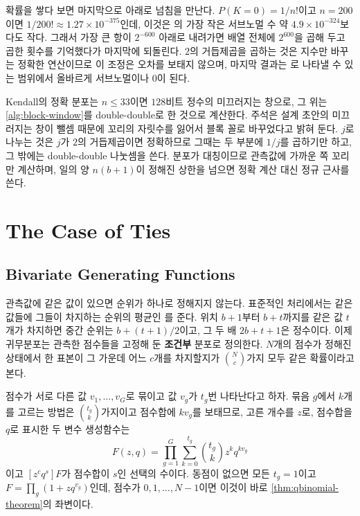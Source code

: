 확률을 쌓다 보면 마지막으로 아래로 넘침을 만난다. $P(K=0)=1/n!$이고 $n=200$이면 $1/200!\approx1.27\times10^{-375}$인데, 이것은 의 가장 작은 서브노멀 수 약 $4.9\times10^{-324}$보다도 작다. 그래서 가장 큰 항이 $2^{-600}$ 아래로 내려가면 배열 전체에 $2^{600}$을 곱해 두고 곱한 횟수를 기억했다가 마지막에 되돌린다. $2$의 거듭제곱을 곱하는 것은 지수만 바꾸는 정확한 연산이므로 이 조정은 오차를 보태지 않으며, 마지막 결과는 로 나타낼 수 있는 범위에서 올바르게 서브노멀이나 $0$이 된다.

\begin{instardust}
Kendall의 정확 분포는 $n\le33$이면 $128$비트 정수의 미끄러지는 창으로, 그 위는 \cref{alg:block-window}를 double-double로 한 것으로 계산한다. 주석은 설계 초안의 미끄러지는 창이 뺄셈 때문에 꼬리의 자릿수를 잃어서 블록 꼴로 바꾸었다고 밝혀 둔다. $j$로 나누는 것은 $j$가 $2$의 거듭제곱이면 정확하므로 그때는 두 부분에 $1/j$를 곱하기만 하고, 그 밖에는 double-double 나눗셈을 쓴다. 분포가 대칭이므로 관측값에 가까운 쪽 꼬리만 계산하며, 일의 양 $n(b+1)$이 정해진 상한을 넘으면 정확 계산 대신 정규 근사를 쓴다.
\end{instardust}

\section{The Case of Ties}
\label{sec:perm-ties}

\subsection{Bivariate Generating Functions}

관측값에 같은 값이 있으면 순위가 하나로 정해지지 않는다. 표준적인 처리에서는 같은 값들에 그들이 차지하는 순위의 평균인 를 준다. 위치 $b+1$부터 $b+t$까지를 같은 값 $t$개가 차지하면 중간 순위는 $b+(t+1)/2$이고, 그 두 배 $2b+t+1$은 정수이다. 이제 귀무분포는 관측한 점수들을 고정해 둔 \textbf{조건부} 분포로 정의한다. $N$개의 점수가 정해진 상태에서 한 표본이 그 가운데 어느 $c$개를 차지할지가 $\binom Nc$가지 모두 같은 확률이라고 본다.

점수가 서로 다른 값 $v_1,\dots,v_G$로 묶이고 값 $v_g$가 $t_g$번 나타난다고 하자. 묶음 $g$에서 $k$개를 고르는 방법은 $\binom{t_g}k$가지이고 점수합에 $kv_g$를 보태므로, 고른 개수를 $z$로, 점수합을 $q$로 표시한 두 변수 생성함수는
\[
F(z,q)=\prod_{g=1}^G\sum_{k=0}^{t_g}\binom{t_g}kz^kq^{kv_g}
\]
이고 $[z^cq^s]F$가 점수합이 $s$인 선택의 수이다. 동점이 없으면 모든 $t_g=1$이고 $F=\prod_g(1+zq^{v_g})$인데, 점수가 $0,1,\dots,N-1$이면 이것이 바로 \cref{thm:qbinomial-theorem}의 좌변이다.

